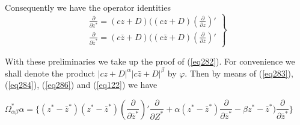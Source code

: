 Consequently we have the operator identities
\begin{equation*}
\left. \tag{286}\label{eq286}   
\begin{aligned}
\frac{\partial}{\partial z^*} = (cz+D)((cz+D)(\frac{\partial}{\partial
  z})'\\ 
\frac{\partial}{\partial \bar{z}^*} =
(c\bar{z}+D)((c\bar{z}+D)(\frac{\partial}{\partial \bar{z}})' 
\end{aligned} 
\right \}
\end{equation*}\pageoriginale

With these preliminaries we take up the proof of (\ref{eq282}). For
convenience we shall denote the product $|cz+D|^\alpha
|c\bar{z}+D|^\beta$ by $\varphi$. Then by means of (\ref{eq283}),
(\ref{eq284}), (\ref{eq286}) and (\ref{eq122}) we have  

\noindent
$\Omega^*_{\alpha \beta} \alpha =\bigg
\{(z^*-\bar{z}^*)(z^*-\bar{z}^*)(\dfrac{\partial}{\partial
  \bar{z}^*})'\dfrac{\partial}{\partial Z^*}+ \alpha
(z^*-\bar{z}^*)\dfrac{\partial}{\partial \bar{z}^*}-\beta
z^*-\bar{z}^*)\dfrac{\partial}{\partial \bar{z}^*}\bigg \} $ 

